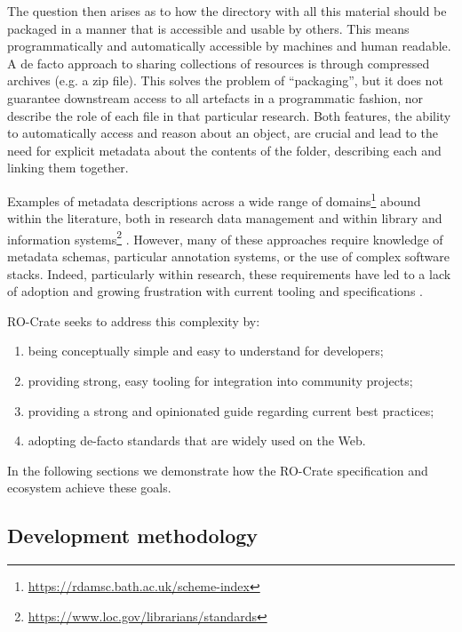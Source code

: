 \documentclass[ds,v1.1.2,openaccess]{iosart2x}%
\begin{document}
The question then arises as to how the directory with all this material
should be packaged in a manner that is accessible and usable by others.
This means programmatically and automatically accessible by machines
and human readable. A de facto approach to sharing collections of
resources is through compressed archives (e.g. a zip file). This solves
the problem of ``packaging'', but it does not guarantee downstream
access to all artefacts in a programmatic fashion, nor describe the
role of each file in that particular research. Both features, the
ability to automatically access and reason about an object, are crucial
and lead to the need for explicit metadata about the contents of the
folder, describing each and linking them together.

Examples of metadata descriptions across a wide range of
domains\footnote{\url{https://rdamsc.bath.ac.uk/scheme-index}} abound within the
literature, both in research data management
\cite{doi:10.1007/s10209-016-0475-y,farnel_2014,doi:10.2777/620649}
and within library and information
systems\footnote{\url{https://www.loc.gov/librarians/standards}} \cite{chan_1995,doi:10.1515/9783598441844}. However, many of these approaches require
knowledge of metadata schemas, particular annotation systems, or the
use of complex software stacks. Indeed, particularly within research,
these requirements have led to a lack of adoption and growing
frustration with current tooling and specifications
\cite{neylon_blog_post_2017,doi:10.1007/s00267-014-0258-2,doi:10.1038/s41597-020-0524-5}.

RO-Crate seeks to address this complexity by:
%
\begin{enumerate}
\item[1.] being conceptually simple and easy to understand for developers;
\item[2.] providing strong, easy tooling for integration into community projects;
\item[3.] providing a strong and opinionated guide regarding current best practices;
\item[4.] adopting de-facto standards that are widely used on the Web.
\end{enumerate}

In the following sections we demonstrate how the RO-Crate specification
and ecosystem achieve these goals.

\subsection{Development methodology}
\end{document}
